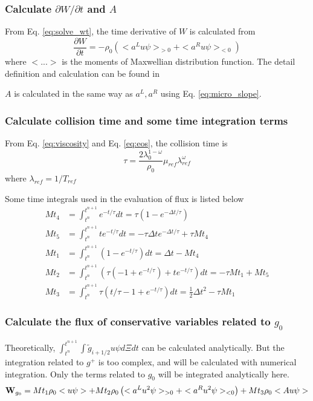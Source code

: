 \documentclass[a4paper]{book}
\begin{document}
\subsubsection*{Calculate ${\partial W}/{\partial t}$ and $A$}
From Eq. \ref{eq:solve_wt}, the time derivative of $W$ is calculated from
$$\frac{\partial W}{\partial t}=-\rho_0\left(<a^Lu\psi>_{>0}+<a^Ru\psi>_{<0}\right)$$
where $<...>$ is the moments of Maxwellian distribution function. The detail definition and calculation can be found in 

$A$ is calculated in the same way as $a^L,a^R$ using Eq. \ref{eq:micro_slope}.

\subsubsection*{Calculate collision time and some time integration terms}
From Eq. \ref{eq:viscosity} and Eq. \ref{eq:eos}, the collision time is
$$\tau = \frac{2\lambda_0^{1-\omega}}{\rho_0}\mu_{ref}\lambda_{ref}^\omega$$
where $\lambda_{ref}=1/T_{ref}$

Some time integrals used in the evaluation of flux is listed below
$$
\begin{aligned}
    Mt_4 &= \int_{t^n}^{t^{n+1}} e^{-t/\tau}dt = \tau(1-e^{-\Delta t/\tau}) \\
    Mt_5 &= \int_{t^n}^{t^{n+1}} te^{-t/\tau}dt = -\tau\Delta t e^{-\Delta t/\tau}+\tau Mt_4 \\
    Mt_1 &= \int_{t^n}^{t^{n+1}} (1-e^{-t/\tau})dt = \Delta t-Mt_4 \\
    Mt_2 &= \int_{t^n}^{t^{n+1}} (\tau(-1+e^{-t/\tau})+te^{-t/\tau})dt = -\tau Mt_1+Mt_5 \\
    Mt_3 &= \int_{t^n}^{t^{n+1}} \tau(t/\tau-1+e^{-t/\tau})dt = \frac{1}{2}\Delta t^2-\tau Mt_1
\end{aligned} 
$$

\subsubsection*{Calculate the flux of conservative variables related to $g_0$}
Theoretically, $\int_{t^n}^{t^{n+1}}\int {\tilde g}_{i+1/2}u\psi d\Xi dt$ can be calculated analytically. But the integration related to $g^+$ is too complex, and will be calculated with numerical integration. Only the terms related to $g_0$ will be integrated analytically here.
$${\bf W}_{g_0} = Mt_1\rho_0<u\psi>+Mt_2\rho_0\left(<a^Lu^2\psi>_{>0}+<a^Ru^2\psi>_{<0}\right)+Mt_3\rho_0<Au\psi>$$
\end{document}
